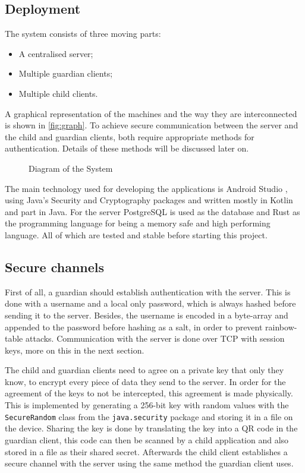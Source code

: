 \documentclass[a4paper]{article}
\begin{document}
\subsection{Deployment}
The system consists of three moving parts:
\begin{itemize}
    \item A centralised server;
    \item Multiple guardian clients;
    \item Multiple child clients.
\end{itemize}
A graphical representation of the machines and the way they are interconnected is shown in \autoref{fig:graph}. To achieve secure communication between the server and the child and guardian clients, both require appropriate methods for authentication. Details of these methods will be discussed later on. 

\begin{figure}[ht!]
    \centering
    
    \caption{Diagram of the System}\label{fig:graph}
\end{figure}

The main technology used for developing the applications is Android Studio \cite{android_studio}, using Java's Security \cite{java_security} and Cryptography \cite{javax_crypto} packages and written mostly in Kotlin \cite{kotlin} and part in Java. For the server PostgreSQL \cite{postgres} is used as the database and Rust \cite{rust} as the programming language for being a memory safe and high performing language. All of which are tested and stable before starting this project.

\subsection{Secure channels}
First of all, a guardian should establish authentication with the server. This is done with a username and a local only password, which is always hashed before sending it to the server. Besides, the username is encoded in a byte-array and appended to the password before hashing as a salt, in order to prevent rainbow-table attacks. Communication with the server is done over TCP with session keys, more on this in the next section.  

The child and guardian clients need to agree on a private key that only they know, to encrypt every piece of data they send to the server. In order for the agreement of the keys to not be intercepted, this agreement is made physically. This is implemented by generating a 256-bit key with random values with the \texttt{SecureRandom} class \cite{secure_random} from the \texttt{java.security} package and storing it in a file on the device. Sharing the key is done by translating the key into a QR code in the guardian client, this code can then be scanned by a child application and also stored in a file as their shared secret. Afterwards the child client establishes a secure channel with the server using the same method the guardian client uses.
\end{document}
